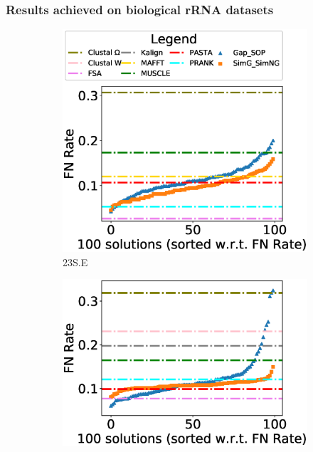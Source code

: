 \subsubsection{Results achieved on biological rRNA datasets}
\begin{figure}[!htbp]
	\centering
	\begin{adjustwidth}{-0.5cm}{-0.5cm}
		\begin{subfigure}[b]{0.25\textwidth}
			\includegraphics[width=\columnwidth]{Figure/summary/precomputedInit/23S.E/fnrate_density_single_run}
			\caption{23S.E}
\end{subfigure}    
		\begin{subfigure}[b]{0.25\textwidth}
			\includegraphics[width=\columnwidth]{Figure/summary/precomputedInit/23S.E.aa_ag/fnrate_density_single_run}

\end{subfigure}
\end{adjustwidth}
\end{figure}
